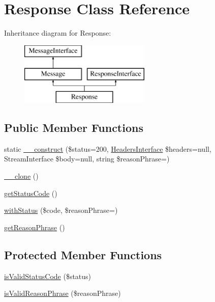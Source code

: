 \hypertarget{class_pes_1_1_http_1_1_response}{}\section{Response Class Reference}
\label{class_pes_1_1_http_1_1_response}
Inheritance diagram for Response\+:\begin{figure}[H]
\begin{center}
\leavevmode
\includegraphics[height=3.000000cm]{class_pes_1_1_http_1_1_response}
\end{center}
\end{figure}
\subsection*{Public Member Functions}
\begin{DoxyCompactItemize}
\item 
static \mbox{\hyperlink{class_pes_1_1_http_1_1_response_addbc35df9e7d4a465be0056eeb28c462}{\+\_\+\+\_\+construct}} (\$status=200, \mbox{\hyperlink{interface_pes_1_1_http_1_1_headers_interface}{Headers\+Interface}} \$headers=null, Stream\+Interface \$body=null, string \$reason\+Phrase=\textquotesingle{}\textquotesingle{})
\item 
\mbox{\hyperlink{class_pes_1_1_http_1_1_response_ad0cb87b388bc74d63dc884accdca8713}{\+\_\+\+\_\+clone}} ()
\item 
\mbox{\hyperlink{class_pes_1_1_http_1_1_response_a094778dd1c04fe44626000b47ea0c0bb}{get\+Status\+Code}} ()
\item 
\mbox{\hyperlink{class_pes_1_1_http_1_1_response_adea4a553d385286f0457844663023b27}{with\+Status}} (\$code, \$reason\+Phrase=\textquotesingle{}\textquotesingle{})
\item 
\mbox{\hyperlink{class_pes_1_1_http_1_1_response_ad2574b5790012944a05218ed095d919d}{get\+Reason\+Phrase}} ()
\end{DoxyCompactItemize}
\subsection*{Protected Member Functions}
\begin{DoxyCompactItemize}
\item 
\mbox{\hyperlink{class_pes_1_1_http_1_1_response_a8d86609842e7a0a93c0be183b70dbd30}{is\+Valid\+Status\+Code}} (\$status)
\item 
\mbox{\hyperlink{class_pes_1_1_http_1_1_response_a6d3d6ad45feb397f6a7591d0c2c65234}{is\+Valid\+Reason\+Phrase}} (\$reason\+Phrase)
\end{DoxyCompactItemize}
